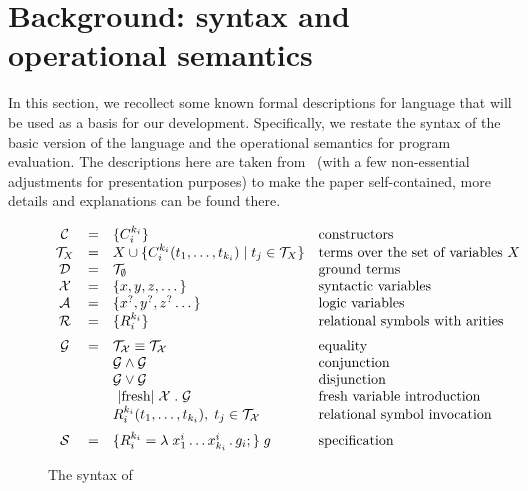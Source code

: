 \section{Background: syntax and operational semantics}
\label{sec:background}

In this section, we recollect some known formal descriptions for \mK language that will be used as a basis for our development.
Specifically, we restate the syntax of the basic version of the language and the operational semantics for program evaluation.
The descriptions here are taken from~\cite{CertifiedSemantics} (with a few non-essential adjustments for presentation purposes) to make
the paper self-contained, more details and explanations can be found there.

\begin{figure}[t]
\centering
\[
\begin{array}{ccll}
  \mathcal{C} & = & \{C_i^{k_i}\} & \mbox{constructors} \\
  \mathcal{T}_X & = & X \cup \{C_i^{k_i} (t_1, \dots, t_{k_i}) \mid t_j\in\mathcal{T}_X\} & \mbox{terms over the set of variables $X$} \\
  \mathcal{D} & = & \mathcal{T}_\emptyset & \mbox{ground terms}\\
  \mathcal{X} & = & \{ x, y, z, \dots \} & \mbox{syntactic variables} \\
  \mathcal{A} & = & \{ x^?, y^?, z^? \dots \} & \mbox{logic variables} \\
  \mathcal{R} & = & \{ R_i^{k_i}\} &\mbox{relational symbols with arities} \\[2mm]
  \mathcal{G} & = & \mathcal{T_X}\equiv\mathcal{T_X}   &  \mbox{equality} \\
              &   & \mathcal{G}\wedge\mathcal{G}     & \mbox{conjunction} \\
              &   & \mathcal{G}\vee\mathcal{G}       &\mbox{disjunction} \\
              &   & \mbox{\lstinline|fresh|}\;\mathcal{X}\;.\;\mathcal{G} & \mbox{fresh variable introduction} \\
              &   & R_i^{k_i} (t_1,\dots,t_{k_i}),\;t_j\in\mathcal{T_X} & \mbox{relational symbol invocation} \\[2mm]
  \mathcal{S} & = & \{R_i^{k_i} = \lambda\;x_1^i\dots x_{k_i}^i\,.\, g_i;\}\; g & \mbox{specification}
\end{array}
\]
\caption{The syntax of \mK}
\label{fig:syntax}
\end{figure}

